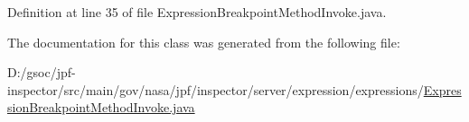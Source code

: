 Definition at line 35 of file Expression\+Breakpoint\+Method\+Invoke.\+java.



The documentation for this class was generated from the following file\+:\begin{DoxyCompactItemize}
\item 
D\+:/gsoc/jpf-\/inspector/src/main/gov/nasa/jpf/inspector/server/expression/expressions/\hyperlink{_expression_breakpoint_method_invoke_8java}{Expression\+Breakpoint\+Method\+Invoke.\+java}\end{DoxyCompactItemize}

